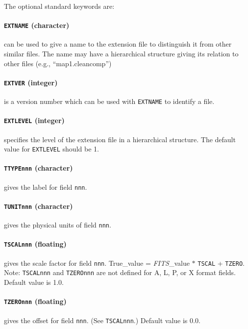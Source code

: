 The optional standard keywords are:

\paragraph {{\tt EXTNAME} (character)} can 
be used to give a name to the extension file
to distinguish it from other similar files.  The name may have a
hierarchical structure giving its relation to other files (e.g., 
``map1.cleancomp'')

\paragraph {{\tt EXTVER} (integer)} is
 a version number which can be used with {\tt EXTNAME} to
identify a file.

\paragraph {{\tt EXTLEVEL} (integer)} specifies 
the level of the extension file in a hierarchical structure.  
The default value for {\tt EXTLEVEL} should be 1.

\paragraph {{\tt TTYPEnnn} (character)} gives
 the label for field {\tt nnn}. 
 
\paragraph {{\tt TUNITnnn} (character)} gives 
the physical units of field {\tt nnn}.

\paragraph {{\tt TSCALnnn} (floating)} gives 
the scale factor for field {\tt nnn}. True\_value =
{\em FITS\/}\_value $\ast$ {\tt TSCAL} + {\tt TZERO}.  
Note: {\tt TSCALnnn} and {\tt TZEROnnn} are not
defined for A, L, P, or X format fields. Default value is 1.0.

\paragraph {{\tt TZEROnnn} (floating)} 
gives the offset for field {\tt nnn}. (See
{\tt TSCALnnn}.) Default value is 0.0.

